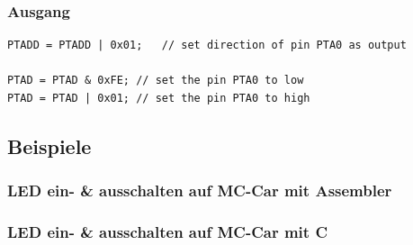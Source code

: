 \subsubsection{Ausgang}
\begin{lstlisting}
PTADD = PTADD | 0x01;	// set direction of pin PTA0 as output

PTAD = PTAD & 0xFE;	// set the pin PTA0 to low
PTAD = PTAD | 0x01;	// set the pin PTA0 to high
\end{lstlisting}

\newpage
\subsection{Beispiele}

\subsubsection{LED ein- \& ausschalten auf MC-Car mit Assembler}


\subsubsection{LED ein- \& ausschalten auf MC-Car mit C}

